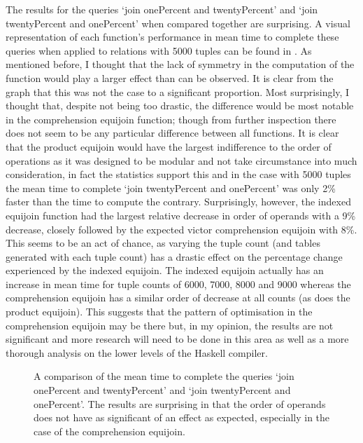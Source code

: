 The results for the queries `join onePercent and twentyPercent' and `join
twentyPercent and onePercent' when compared together are surprising. A visual
representation of each function's performance in mean time to complete these
queries when applied to relations with 5000 tuples can be found in 
. As mentioned before,
I thought that the lack of symmetry in the computation of the function would
play a larger effect than can be observed. It is clear from the graph that this
was not the case to a significant proportion. Most surprisingly, I thought that,
despite not being too drastic, the difference would be most notable in the
comprehension equijoin function; though from further inspection there does not
seem to be any particular difference between all functions. It is clear that the
product equijoin would have the largest indifference to the order of operations
as it was designed to be modular and not take circumstance into much
consideration, in fact the statistics support this and in the case with 5000
tuples the mean time to complete `join twentyPercent and onePercent' was only
2\% faster than the time to compute the contrary. Surprisingly, however, the
indexed equijoin function had the largest relative decrease in order of operands
with a 9\% decrease, closely followed by the expected victor comprehension
equijoin with 8\%. This seems to be an act of chance, as varying the tuple count
(and tables generated with each tuple count) has a drastic effect on the
percentage change experienced by the indexed equijoin. The indexed equijoin
actually has an increase in mean time for tuple counts of 6000, 7000, 8000 and
9000 whereas the comprehension equijoin has a similar order of decrease at all
counts (as does the product equijoin). This suggests that the pattern of
optimisation in the comprehension equijoin may be there but, in my opinion, the
results are not significant and more research will need to be done in this area
as well as a more thorough analysis on the lower levels of the Haskell compiler.

\begin{figure}[p]
    
    \caption{A comparison of the mean time to complete the queries `join
    onePercent and twentyPercent' and `join twentyPercent and onePercent'. The
results are surprising in that the order of operands does not have as
significant of an effect as expected, especially in the case of the
comprehension equijoin.}
    \label{fig:benchmark:onePercent-twentyPercent-flipped-5000}
\end{figure}

